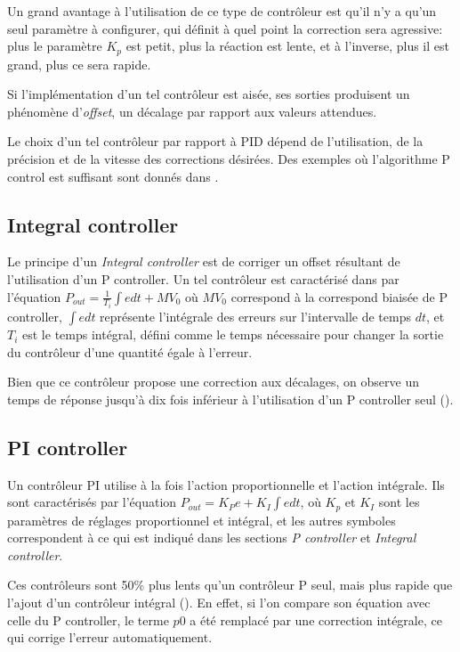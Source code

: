 Un grand avantage à l'utilisation de ce type de contrôleur est qu'il n'y a qu'un seul paramètre à configurer, qui définit à quel point la correction sera agressive: plus le paramètre $K_{p}$ est petit, plus la réaction est lente, et à l'inverse, plus il est grand, plus ce sera rapide.

Si l'implémentation d'un tel contrôleur est aisée, ses sorties produisent un phénomène d'\emph{offset}, un décalage par rapport aux valeurs attendues.

Le choix d'un tel contrôleur par rapport à PID dépend de l'utilisation, de la précision et de la vitesse des corrections désirées. Des exemples où l'algorithme P control est suffisant sont donnés dans \cite{sellers2001overview}.

\subsection{Integral controller}
Le principe d'un \emph{Integral controller} est de corriger un offset résultant de l'utilisation d'un P controller. Un tel contrôleur est caractérisé dans \cite{svrcek2006real} par l'équation $P_{out} = \frac{1}{T_{i}}\int e dt + MV_{0}$ où $MV_{0}$ correspond à la correspond biaisée de P controller, $\int e dt$ représente l'intégrale des erreurs sur l'intervalle de temps $dt$, et $T_{i}$ est le temps intégral, défini comme le temps nécessaire pour changer la sortie du contrôleur d'une quantité égale à l'erreur.

Bien que ce contrôleur propose une correction aux décalages, on observe un temps de réponse jusqu'à dix fois inférieur à l'utilisation d'un P controller seul (\cite{svrcek2006real}).

\subsection{PI controller}
Un contrôleur PI utilise à la fois l'action proportionnelle et l'action intégrale. Ils sont caractérisés par l'équation $P_{out} = K_{P} e + K_{I} \int e dt$, où $K_{p}$ et $K_{I}$ sont les paramètres de réglages proportionnel et intégral, et les autres symboles correspondent à ce qui est indiqué dans les sections \emph{P controller} et \emph{Integral controller}.

Ces contrôleurs sont 50\% plus lents qu'un contrôleur P seul, mais plus rapide que l'ajout d'un contrôleur intégral (\cite{svrcek2006real}). En effet, si l'on compare son équation avec celle du P controller, le terme $p0$ a été remplacé par une correction intégrale, ce qui corrige l'erreur automatiquement.


